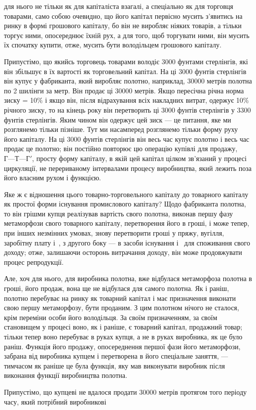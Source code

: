 \parcont{}  %
для нього не тільки як для капіталіста взагалі, а спеціально як
для торговця товарами, само собою очевидно, що його капітал
первісно мусить з’явитись на ринку в формі грошового капіталу,
бо він не виробляє ніяких товарів, а тільки торгує ними, опосереднює їхній рух, а для того, щоб
торгувати ними, він мусить
їх спочатку купити, отже, мусить бути володільцем грошового
капіталу.

Припустімо, що якийсь торговець товарами володіє 3000 фунтами стерлінгів, які він збільшує в їх
вартості як торговельний
капітал. На ці 3000 фунтів стерлінгів він купує у фабриканта,
який виробляє полотно, наприклад, \num{30000} метрів полотна по
2 шилінги за метр. Він продає ці \num{30000} метрів. Якщо пересічна
річна норма зиску = 10\% і якщо він, після відрахування всіх
накладних витрат, одержує 10\% річного зиску, то на кінець року
він перетворить ці 3000 фунтів стерлінгів у 3300 фунтів стерлінгів. Яким чином він одержує цей зиск
— це питання, яке ми
розглянемо тільки пізніше. Тут ми насамперед розглянемо тільки
форму руху його капіталу. На ці 3000 фунтів стерлінгів він
весь час купує полотно і весь час продає це полотно; він постійно повторює цю операцію купівлі для
продажу, $Г — Т — Г'$,
просту форму капіталу, в якій цей капітал цілком зв’язаний у процесі циркуляції, не перериваному
інтервалами процесу виробництва, який лежить поза його власним рухом і функцією.

Яке ж є відношення цього товарно-торговельного капіталу
до товарного капіталу як простої форми існування промислового
капіталу? Щодо фабриканта полотна, то він грішми купця реалізував вартість свого полотна, виконав
першу фазу метаморфози свого товарного капіталу, перетворення його в гроші, і може
тепер, при інших незмінних умовах, знову перетворити гроші
у пряжу, вугілля, заробітну плату і~, з другого боку — в засоби існування і~ для
споживання свого доходу; отже, залишаючи осторонь витрачання доходу, він може продовжувати процес
репродукції.

Але, хоч для нього, для виробника полотна, вже відбулася
метаморфоза полотна в гроші, його продаж, вона ще не відбулася для самого полотна. Як і раніш,
полотно перебуває на ринку
як товарний капітал і має призначення виконати свою першу
метаморфозу, бути проданим. З цим полотном нічого не сталося,
крім переміни особи його володільця. За своїм призначенням, за
своїм становищем у процесі воно, як і раніше, є товарний капітал, продажний товар; тільки тепер воно
перебуває в руках
купця, а не в руках виробника, як це було раніш. Функція його
продажу, опосереднення першої фази його метаморфози, забрана
від виробника купцем і перетворена в його спеціальне заняття, — тимчасом як раніше це була функція,
яку мав виконувати виробник після виконання функції виробництва полотна.

Припустімо, що купцеві не вдалося продати \num{30000} метрів
протягом того періоду часу, який потрібний виробникові
\parbreak{}  %
